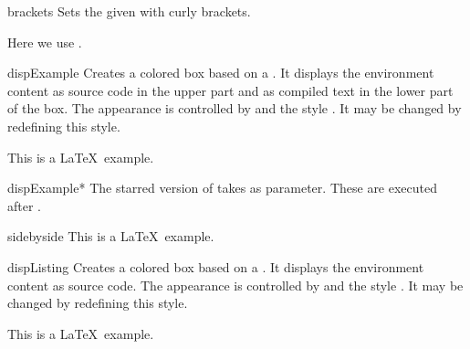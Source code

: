 \clearpage

\begin{docCommand}{brackets}{}
  Sets the given  with curly brackets.
\begin{dispExample}
  Here we use .
\end{dispExample}
\end{docCommand}


{\let\xdispExample\dispExample
  \let\endxdispExample\enddispExample
\begin{docEnvironment}[doc updated=2014-10-10]{dispExample}{}
  Creates a colored box based on a .
  It displays the environment content as source code in the upper part
  and as compiled text in the lower part of the box.
  The appearance is controlled by 
  and the style . It may be
  changed by redefining this style.
{
\begin{xdispExample}
\begin{dispExample}
This is a \LaTeX\ example.
\end{dispExample}
\end{xdispExample}
}
\end{docEnvironment}}


{\let\xdispExample\dispExample
  \let\endxdispExample\enddispExample
\begin{docEnvironment}[doc updated=2014-10-10]{dispExample*}{}
  The starred version of  takes  
  as parameter. These  are executed after .
\begin{xdispExample}
\begin{dispExample*}{sidebyside}
This is a \LaTeX\ example.
\end{dispExample*}
\end{xdispExample}
\end{docEnvironment}}


\clearpage
\begin{docEnvironment}{dispListing}{}
  Creates a colored box based on a .
  It displays the environment content as source code.
  The appearance is controlled by 
  and the style . It may be
  changed by redefining this style.
\begin{dispExample}
\begin{dispListing}
This is a \LaTeX\ example.
\end{dispListing}
\end{dispExample}
\end{docEnvironment}

